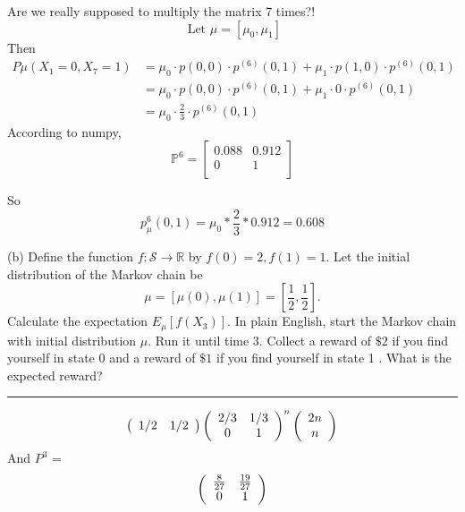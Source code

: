 \documentclass{article} %
\theoremstyle{plain}
\theoremstyle{case}
\begin{document}
\begin{enumerate}[label={\fbox{\textbf{Exercise \#\arabic* :}}}]
Are we really supposed to multiply the matrix 7 times?!
  \[ \text{ Let } \mu=[\mu_0, \mu_1] \]
  Then 
  \begin{align*}
    P\mu (X_1 = 0, X_7 = 1) &= \mu_0 \cdot p(0,0) \cdot p^{(6)}(0,1)  + \mu_1 \cdot p(1,0) \cdot p^{(6)}(0,1) \\
          &= \mu_0 \cdot p(0,0) \cdot p^{(6)}(0,1)  + \mu_1 \cdot 0 \cdot p^{(6)}(0,1) \\
          &= \mu_0 \cdot \frac{2}{3}  \cdot p^{(6)}(0,1)
  \end{align*}
    According to numpy, 
        \begin{equation*}
        \mathbb{P}^6 =
          \begin{bmatrix}
           0.088 & 0.912 \\  
           0 & 1 \\
          \end{bmatrix}
        \end{equation*}

        So 
        \[ p^6_\mu(0,1) =  \mu_0 * \frac{2}{3} * 0.912 = 0.608  \]

(b) Define the function $f: \mathcal{S} \rightarrow \mathbb{R}$ by $f(0)=2, f(1)=1$. Let the initial distribution of the Markov chain be
$$
\mu=[\mu(0), \mu(1)]=\left[\frac{1}{2}, \frac{1}{2}\right] .
$$
Calculate the expectation $E_\mu\left[f\left(X_3\right)\right]$.
In plain English, start the Markov chain with initial distribution $\mu$. Run it until time 3. Collect a reward of $\$ 2$ if you find yourself in state 0 and a reward of $\$ 1$ if you find yourself in state 1 . What is the expected reward?
\par\noindent\rule{\textwidth}{0.1pt}

  \[
      \left(
      \begin{array}{cc}
        1/2 & 1/2 \\
      \end{array}
     \right)
%
      \left(
        \begin{array}{c c}
          2/3 & 1/3 \\
          0   & 1 
        \end{array}
      \right)^n
%
      \left(
        \begin{array}{c}
        2n \\
        n 
        \end{array}
      \right)
\]
  And $P^3$ = 
  \[
      \left(
        \begin{array}{c c}
          \frac{8}{27} & \frac{19}{27} \\
          0   & 1 
        \end{array}
      \right)
    \]


\end{enumerate}
\end{document}
